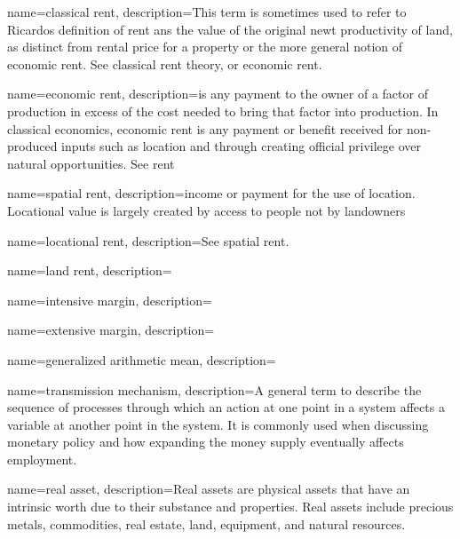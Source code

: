 



{
name=classical rent,
description={This term is sometimes used to refer to Ricardos definition of rent ans the value of the original newt productivity of land, as distinct from rental price for a property or the more general notion of economic rent. See \gls{classical rent theory}, or \gls{economic rent}.}
}

{
name=economic rent,
description={is any payment to the owner of a factor of production in excess of the cost needed to bring that factor into production. In classical economics, economic rent is any payment  or benefit received for non-produced inputs such as location  and through creating official privilege over natural opportunities. See \gls{rent}}
}

{
name=spatial rent,
description={income or payment for the use of location. Locational value is largely created by access to people not by landowners}
}

{
name=locational rent,
description={See \gls{spatial rent}.}
}

{
name=land rent,
description={}
}

{
name=intensive margin,
description={}
}

{
name=extensive margin,
description={}
}

{
name=generalized arithmetic mean,
description={}
}

{
name=transmission mechanism,
description={A general term to describe the sequence of processes through which an action at one point in a system  affects a variable at another point in the system. It is commonly used when discussing  monetary policy and how  expanding the money supply eventually affects employment.}
}

{
name=real asset,
description={Real assets are physical assets that have an intrinsic worth due to their substance and properties. Real assets include precious metals, commodities, real estate, land, equipment, and natural resources. }
}

